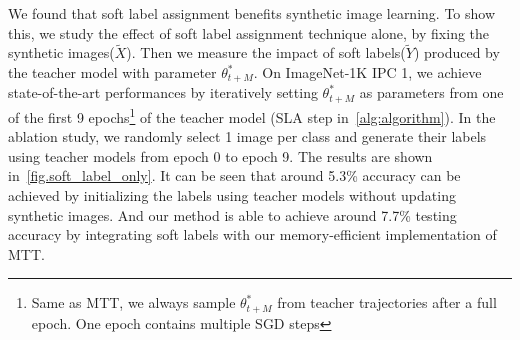 \documentclass[10pt,twocolumn,letterpaper]{article}
\begin{document}
We found that soft label assignment benefits synthetic image learning. To show this, we study the effect of soft label assignment technique alone, by fixing the synthetic images($\tilde{X}$). Then we measure the impact of soft labels($\tilde{Y}$) produced by the teacher model with parameter $\theta_{t+M}^*$.
On ImageNet-1K IPC 1, we achieve state-of-the-art performances by iteratively setting $\theta_{t+M}^*$ as parameters from one of the first 9 epochs\footnote{Same as MTT, we always sample $\theta_{t+M}^*$ from teacher trajectories after a full epoch. One epoch contains multiple SGD steps} of the teacher model (SLA step in~\cref{alg:algorithm}). In the ablation study, we randomly select 1 image per class and generate their labels using teacher models from epoch 0 to epoch 9. The results are shown in~\cref{fig.soft_label_only}. It can be seen that around 5.3\% accuracy can be achieved by initializing the labels using teacher models without updating synthetic images. And our method is able to achieve around 7.7\% testing accuracy by integrating soft labels with our memory-efficient implementation of MTT.
\end{document}
